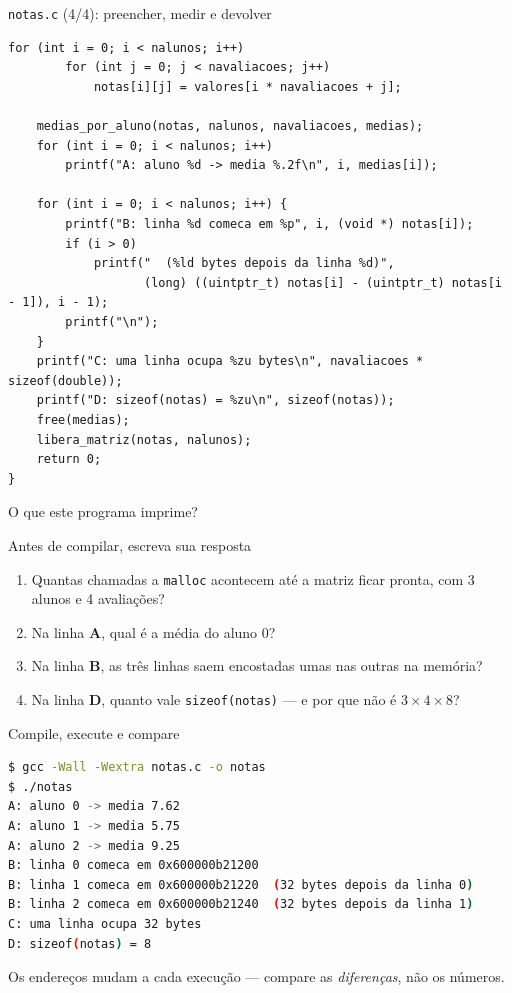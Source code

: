 \documentclass[aspectratio=169]{beamer}
\begin{document}
\begin{frame}[fragile]{\texttt{notas.c} (4/4): preencher, medir e devolver}
\begin{lstlisting}[basicstyle=\ttfamily\tiny, firstnumber=54]
    for (int i = 0; i < nalunos; i++)
        for (int j = 0; j < navaliacoes; j++)
            notas[i][j] = valores[i * navaliacoes + j];

    medias_por_aluno(notas, nalunos, navaliacoes, medias);
    for (int i = 0; i < nalunos; i++)
        printf("A: aluno %d -> media %.2f\n", i, medias[i]);

    for (int i = 0; i < nalunos; i++) {
        printf("B: linha %d comeca em %p", i, (void *) notas[i]);
        if (i > 0)
            printf("  (%ld bytes depois da linha %d)",
                   (long) ((uintptr_t) notas[i] - (uintptr_t) notas[i - 1]), i - 1);
        printf("\n");
    }
    printf("C: uma linha ocupa %zu bytes\n", navaliacoes * sizeof(double));
    printf("D: sizeof(notas) = %zu\n", sizeof(notas));
    free(medias);
    libera_matriz(notas, nalunos);
    return 0;
}
\end{lstlisting}
\end{frame}

\begin{frame}{O que este programa imprime?}
  \begin{block}{Antes de compilar, escreva sua resposta}
    \begin{enumerate}
      \item Quantas chamadas a \texttt{malloc} acontecem até a matriz ficar
        pronta, com 3 alunos e 4 avaliações?
      \item Na linha \textbf{A}, qual é a média do aluno 0?
      \item Na linha \textbf{B}, as três linhas saem encostadas umas nas
        outras na memória?
      \item Na linha \textbf{D}, quanto vale \texttt{sizeof(notas)} --- e por
        que não é $3 \times 4 \times 8$?
    \end{enumerate}
  \end{block}
\end{frame}

\begin{frame}[fragile]{Compile, execute e compare}
\begin{lstlisting}[basicstyle=\ttfamily\scriptsize, numbers=none, language=bash]
$ gcc -Wall -Wextra notas.c -o notas
$ ./notas
A: aluno 0 -> media 7.62
A: aluno 1 -> media 5.75
A: aluno 2 -> media 9.25
B: linha 0 comeca em 0x600000b21200
B: linha 1 comeca em 0x600000b21220  (32 bytes depois da linha 0)
B: linha 2 comeca em 0x600000b21240  (32 bytes depois da linha 1)
C: uma linha ocupa 32 bytes
D: sizeof(notas) = 8
\end{lstlisting}
  \begin{block}{}
    \small Os endereços mudam a cada execução --- compare as
    \emph{diferenças}, não os números.
  \end{block}
\end{frame}
\end{document}

